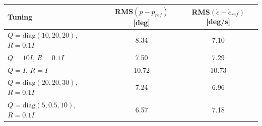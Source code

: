 \begin{tabular}{lcc}
\hline
Tuning & RMS$(p - p_{ref})$ [deg] & RMS$(\dot{e} - \dot{e}_{ref})$ [deg/s] \\
\hline
$Q = \mathrm{diag}(10, 20, 20)$, $R = 0.1I$ & 8.34 & 7.10 \\
$Q = 10I$, $R = 0.1I$ & 7.50 & 7.29 \\
$Q = I$, $R = I$ & 10.72 & 10.73 \\
$Q = \mathrm{diag}(20, 20, 30)$, $R = 0.1I$ & 7.24 & 6.96 \\
$Q = \mathrm{diag}(5, 0.5, 10)$, $R = 0.1I$ & 6.57 & 7.18 \\
\hline
\end{tabular}
